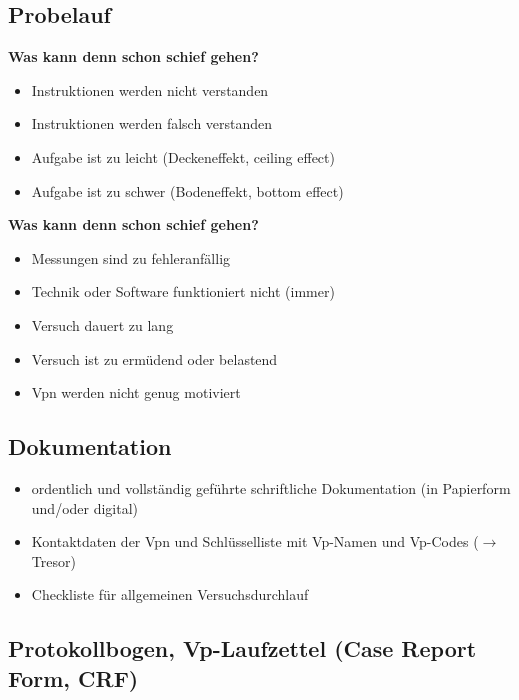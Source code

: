 \documentclass[
]{book}
\begin{document}
\hypertarget{probelauf}{%
\subsection{Probelauf}\label{probelauf}}

\textbf{Was kann denn schon schief gehen?}

\begin{itemize}
\item
  Instruktionen werden nicht verstanden
\item
  Instruktionen werden falsch verstanden
\item
  Aufgabe ist zu leicht (Deckeneffekt, ceiling effect)
\item
  Aufgabe ist zu schwer (Bodeneffekt, bottom effect)
\end{itemize}

\textbf{Was kann denn schon schief gehen?}

\begin{itemize}
\item
  Messungen sind zu fehleranfällig
\item
  Technik oder Software funktioniert nicht (immer)
\item
  Versuch dauert zu lang
\item
  Versuch ist zu ermüdend oder belastend
\item
  Vpn werden nicht genug motiviert
\end{itemize}

\hypertarget{dokumentation}{%
\subsection{Dokumentation}\label{dokumentation}}

\begin{itemize}
\item
  ordentlich und vollständig geführte schriftliche Dokumentation (in Papierform und/oder digital)
\item
  Kontaktdaten der Vpn und Schlüsselliste mit Vp-Namen und Vp-Codes (\(\rightarrow\) Tresor)
\item
  Checkliste für allgemeinen Versuchsdurchlauf
\end{itemize}

\hypertarget{protokollbogen-vp-laufzettel-case-report-form-crf}{%
\subsection{Protokollbogen, Vp-Laufzettel (Case Report Form, CRF)}\label{protokollbogen-vp-laufzettel-case-report-form-crf}}
\end{document}
